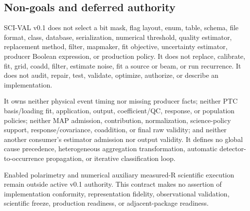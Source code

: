\subsection{Non-goals and deferred authority}

SCI-VAL v0.1 does not select a bit mask, flag layout, enum, table, schema, file
format, class, database, serialization, numerical threshold, quality
estimator, replacement method, filter, mapmaker, fit objective, uncertainty
estimator, producer Boolean expression, or production policy. It does not
replace, calibrate, fit, grid, coadd, filter, estimate noise, fit a source or
beam, or run recurrence. It does not audit, repair, test, validate, optimize,
authorize, or describe an implementation.

It owns neither physical event timing nor missing producer facts; neither PTC
basis/loading fit, application, output, coefficient/QC, response, or
population policies; neither MAP admission, contribution, normalization,
science-policy support, response/covariance, coaddition, or final raw
validity; and neither another consumer's estimator admission nor output
validity. It defines no global cause precedence, heterogeneous aggregation
transformation, automatic detector-to-occurrence propagation, or iterative
classification loop.

Enabled polarimetry and numerical auxiliary measured-R scientific execution
remain outside active v0.1 authority. This contract makes no assertion of
implementation conformity, representation fidelity, observational
validation, scientific freeze, production readiness, or adjacent-package
readiness.
